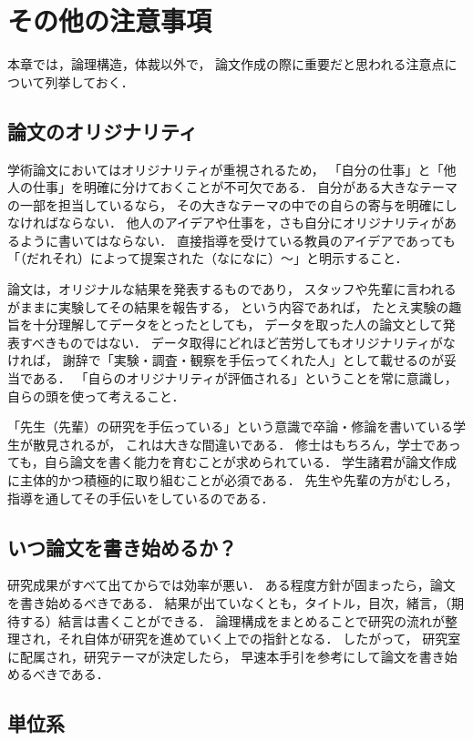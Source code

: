 ﻿\chapter{%
その他の注意事項}

本章では，論理構造，体裁以外で，
論文作成の際に重要だと思われる注意点について列挙しておく．


\section{論文のオリジナリティ}

学術論文においてはオリジナリティが重視されるため，
「自分の仕事」と「他人の仕事」を明確に分けておくことが不可欠である．
自分がある大きなテーマの一部を担当しているなら，
その大きなテーマの中での自らの寄与を明確にしなければならない．
他人のアイデアや仕事を，さも自分にオリジナリティがあるように書いてはならない．
直接指導を受けている教員のアイデアであっても「（だれそれ）によって提案された（なになに）～」と明示すること．

論文は，オリジナルな結果を発表するものであり，
スタッフや先輩に言われるがままに実験してその結果を報告する，
という内容であれば，
たとえ実験の趣旨を十分理解してデータをとったとしても，
データを取った人の論文として発表すべきものではない．
データ取得にどれほど苦労してもオリジナリティがなければ，
謝辞で「実験・調査・観察を手伝ってくれた人」として載せるのが妥当である．
「自らのオリジナリティが評価される」ということを常に意識し，
自らの頭を使って考えること．

「先生（先輩）の研究を手伝っている」という意識で卒論・修論を書いている学生が散見されるが，
これは大きな間違いである．
修士はもちろん，学士であっても，自ら論文を書く能力を育むことが求められている．
学生諸君が論文作成に主体的かつ積極的に取り組むことが必須である．
先生や先輩の方がむしろ，指導を通してその手伝いをしているのである．


\section{いつ論文を書き始めるか？}

研究成果がすべて出てからでは効率が悪い．
ある程度方針が固まったら，論文を書き始めるべきである．
結果が出ていなくとも，タイトル，目次，緒言，（期待する）結言は書くことができる．
論理構成をまとめることで研究の流れが整理され，それ自体が研究を進めていく上での指針となる．
したがって，
研究室に配属され，研究テーマが決定したら，
早速本手引を参考にして論文を書き始めるべきである．


\section{単位系}

